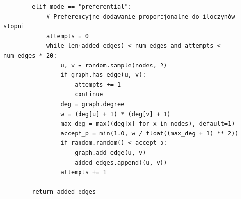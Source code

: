 {\begin{verbatim}
        elif mode == "preferential":
            # Preferencyjne dodawanie proporcjonalne do iloczynów stopni
            attempts = 0
            while len(added_edges) < num_edges and attempts < num_edges * 20:
                u, v = random.sample(nodes, 2)
                if graph.has_edge(u, v):
                    attempts += 1
                    continue
                deg = graph.degree
                w = (deg[u] + 1) * (deg[v] + 1)
                max_deg = max((deg[x] for x in nodes), default=1)
                accept_p = min(1.0, w / float((max_deg + 1) ** 2))
                if random.random() < accept_p:
                    graph.add_edge(u, v)
                    added_edges.append((u, v))
                attempts += 1

        return added_edges
\end{verbatim}
    }
